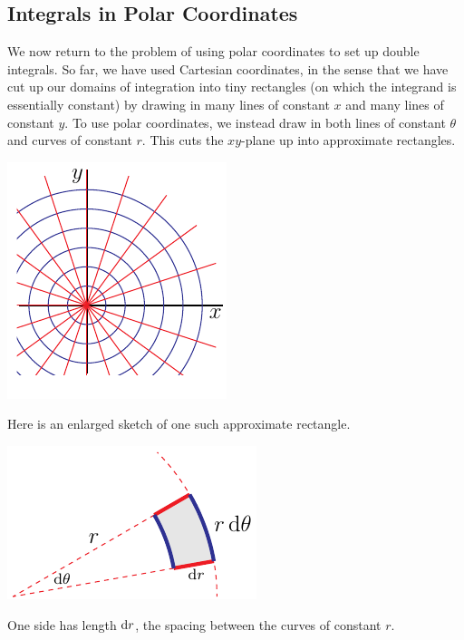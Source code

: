 \subsection{Integrals in Polar Coordinates} \label{sec polar integrals}

We now return to the problem of using polar coordinates to set up 
double integrals. So far, we have used Cartesian coordinates, in the sense
that we have cut up our domains of integration into tiny rectangles
(on which the integrand is essentially constant) by drawing in many lines of
constant $x$ and many lines of constant $y$. To use polar coordinates,
we instead draw in both lines of constant $\theta$ and curves of constant $r$.
This cuts the $xy$-plane up into approximate rectangles.
\begin{efig}
\begin{center}
    \includegraphics{polarRTh.pdf}
\end{center}
\end{efig}
Here is an enlarged sketch of one such approximate rectangle.
\begin{efig}
\begin{center}
    \includegraphics{polarA.pdf}
\end{center}
\end{efig}
One side has length $\mathrm{d}r$, the spacing between the curves of constant $r$.
